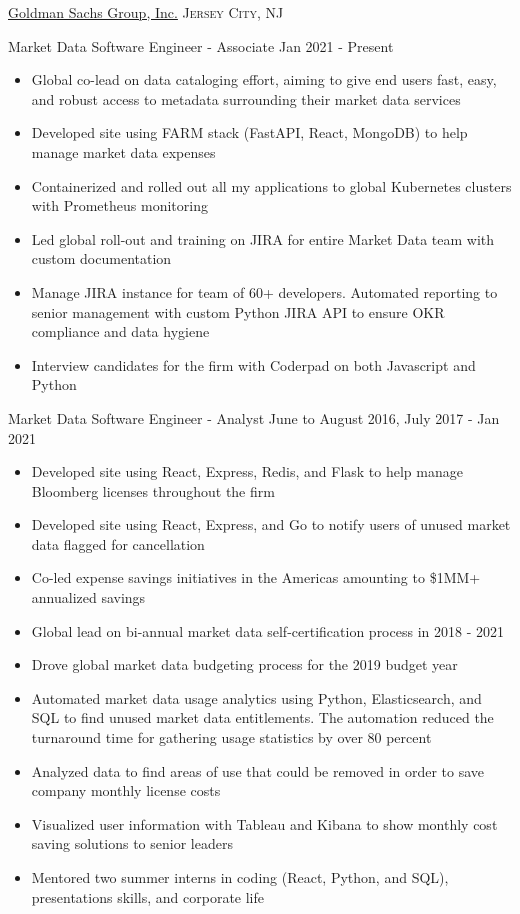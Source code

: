 \documentclass[10pt,letterpaper]{article}
\begin{document}
\headedsection
  {\href{http://www.goldmansachs.com/}{Goldman Sachs Group, Inc.}}
  {\textsc{Jersey City, NJ}} {
  \headedsubsection
    {Market Data Software Engineer - Associate}
    {Jan 2021 - Present}
    {\begin{itemize}
    \item Global co-lead on data cataloging effort, aiming to give end users fast, easy, and robust access to metadata surrounding their market data services
    \item Developed site using FARM stack (FastAPI, React, MongoDB) to help manage market data expenses
    \item Containerized and rolled out all my applications to global Kubernetes clusters with Prometheus monitoring
    \item Led global roll-out and training on JIRA for entire Market Data team with custom documentation
    \item Manage JIRA instance for team of 60+ developers. Automated reporting to senior management with custom Python JIRA API to ensure OKR compliance and data hygiene
    \item Interview candidates for the firm with Coderpad on both Javascript and Python
    \end{itemize}}
  \headedsubsection
    {Market Data Software Engineer - Analyst}
    {June to August 2016, July 2017 - Jan 2021}
    {\begin{itemize}
    \item Developed site using React, Express, Redis, and Flask to help manage Bloomberg licenses throughout the firm
    \item Developed site using React, Express, and Go to notify users of unused market data flagged for cancellation
    \item Co-led expense savings initiatives in the Americas amounting to \$1MM+ annualized savings
    \item Global lead on bi-annual market data self-certification process in 2018 - 2021
    \item Drove global market data budgeting process for the 2019 budget year
    \item Automated market data usage analytics using Python, Elasticsearch, and SQL to find unused market data entitlements. The automation reduced the turnaround time for gathering usage statistics by over 80 percent
    \item Analyzed data to find areas of use that could be removed in order to save company monthly license costs
    \item Visualized user information with Tableau and Kibana to show monthly cost saving solutions to senior leaders
    \item Mentored two summer interns in coding (React, Python, and SQL), presentations skills, and corporate life
    \end{itemize}}
}
\end{document}
